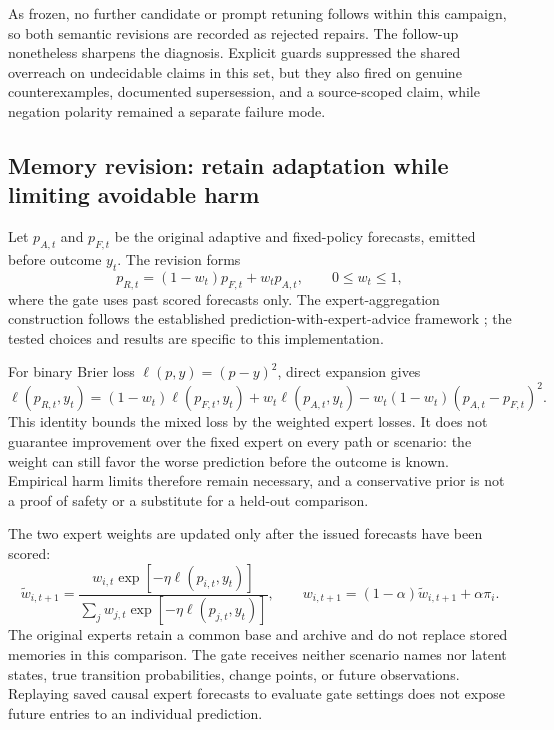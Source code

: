 As frozen, no further candidate or prompt retuning follows within this campaign, so both semantic revisions are recorded as rejected repairs. The follow-up nonetheless sharpens the diagnosis. Explicit guards suppressed the shared overreach on undecidable claims in this set, but they also fired on genuine counterexamples, documented supersession, and a source-scoped claim, while negation polarity remained a separate failure mode.

\subsection{Memory revision: retain adaptation while limiting avoidable harm}
Let $p_{A,t}$ and $p_{F,t}$ be the original adaptive and fixed-policy forecasts, emitted before outcome $y_t$. The revision forms
\begin{equation}
 p_{R,t}=(1-w_t)p_{F,t}+w_t p_{A,t},\qquad 0\le w_t\le1,
\end{equation}
where the gate uses past scored forecasts only. The expert-aggregation construction follows the established prediction-with-expert-advice framework \cite{cesabianchi}; the tested choices and results are specific to this implementation.

For binary Brier loss $\ell(p,y)=(p-y)^2$, direct expansion gives
\begin{equation}
 \ell(p_{R,t},y_t)=(1-w_t)\ell(p_{F,t},y_t)+w_t\ell(p_{A,t},y_t)
 -w_t(1-w_t)(p_{A,t}-p_{F,t})^2.
\label{eq:convex-gate}
\end{equation}
This identity bounds the mixed loss by the weighted expert losses. It does not guarantee improvement over the fixed expert on every path or scenario: the weight can still favor the worse prediction before the outcome is known. Empirical harm limits therefore remain necessary, and a conservative prior is not a proof of safety or a substitute for a held-out comparison.

The two expert weights are updated only after the issued forecasts have been scored:
\begin{equation}
 \widetilde w_{i,t+1}=
 \frac{w_{i,t}\exp[-\eta\ell(p_{i,t},y_t)]}
 {\sum_jw_{j,t}\exp[-\eta\ell(p_{j,t},y_t)]},
 \qquad w_{i,t+1}=(1-\alpha)\widetilde w_{i,t+1}+\alpha\pi_i.
\end{equation}
The original experts retain a common base and archive and do not replace stored memories in this comparison. The gate receives neither scenario names nor latent states, true transition probabilities, change points, or future observations. Replaying saved causal expert forecasts to evaluate gate settings does not expose future entries to an individual prediction.

